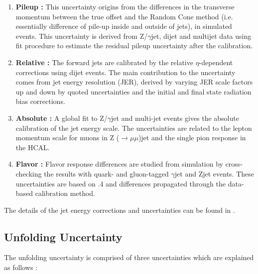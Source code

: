 \begin{enumerate}
\item {\bf Pileup :} This uncertainty origins from the differences in the transverse momentum between the true offset and the Random Cone method (i.e. essentially difference of pile-up inside and outside of jets), in simulated events. This uncertainty is derived from Z/$\gamma$\plusn jet, dijet and multijet data using fit procedure to estimate the residual pileup uncertainty after the calibration. 

\item {\bf Relative :} The forward jets are calibrated by the relative $\eta$-dependent corrections using dijet events. The main contribution to the uncertainty comes from jet energy resolution (JER), derived by varying JER scale factors up and down by quoted uncertainties and the initial and final state radiation bias corrections.

\item {\bf Absolute :} A global fit to Z/$\gamma$\plusn jet and multi-jet events gives the absolute calibration of the jet energy scale. The uncertainties are related to the lepton momentum scale for muons in Z ($\rightarrow\mu\mu$)\plusn jet and the single pion response in the HCAL. 

\item {\bf Flavor :} Flavor response differences are studied from simulation by cross-checking the results with quark- and gluon-tagged $\gamma$\plusn jet and Z\plusn jet events. These uncertainties are based on \PYTHIASn.4 and  differences propagated through the data-based calibration method.
\end{enumerate}

The details of the jet energy corrections and uncertainties can be found in \cite{JEC}. 

\subsection{Unfolding Uncertainty}
\label{sec:unfolding_unc}

The unfolding uncertainty is comprised of three uncertainties which are explained as follows :

